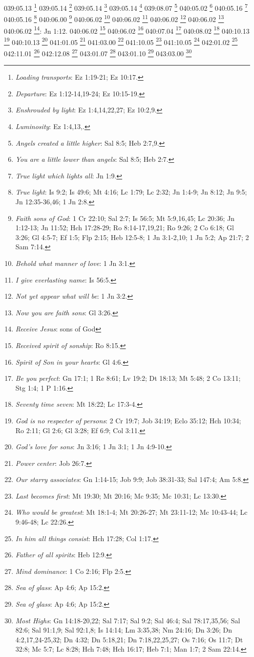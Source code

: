 {039:05.13 \footnote{\textit{Loading transports}: Ez 1:19-21; Ez 10:17.}
039:05.14 \footnote{\textit{Departure}: Ez 1:12-14,19-24; Ez 10:15-19.}
039:05.14 \footnote{\textit{Enshrouded by light}: Ez 1:4,14,22,27; Ez 10:2,9.}
039:05.14 \footnote{\textit{Luminosity}: Ez 1:4,13,.}
039:08.07 \footnote{\textit{Angels created a little higher}: Sal 8:5; Heb 2:7,9.}
040:05.02 \footnote{\textit{You are a little lower than angels}: Sal 8:5; Heb 2:7.}
040:05.16 \footnote{\textit{True light which lights all}: Jn 1:9.}
040:05.16 \footnote{\textit{True light}: Is 9:2; Is 49:6; Mt 4:16; Lc 1:79; Lc 2:32; Jn 1:4-9; Jn 8:12; Jn 9:5; Jn 12:35-36,46; 1 Jn 2:8.}
040:06.00 \footnote{\textit{Faith sons of God}: 1 Cr 22:10; Sal 2:7; Is 56:5; Mt 5:9,16,45; Lc 20:36; Jn 1:12-13; Jn 11:52; Hch 17:28-29; Ro 8:14-17,19,21; Ro 9:26; 2 Co 6:18; Gl 3:26; Gl 4:5-7; Ef 1:5; Flp 2:15; Heb 12:5-8; 1 Jn 3:1-2,10; 1 Jn 5:2; Ap 21:7; 2 Sam 7:14.}
040:06.02 \footnote{\textit{Behold what manner of love}: 1 Jn 3:1.}
040:06.02 \footnote{\textit{I give everlasting name}: Is 56:5.}
040:06.02 \footnote{\textit{Not yet appear what will be}: 1 Jn 3:2.}
040:06.02 \footnote{\textit{Now you are faith sons}: Gl 3:26.}
040:06.02 \footnote{\textit{Receive Jesus}: sons of God}: Jn 1:12.}
040:06.02 \footnote{\textit{Received spirit of sonship}: Ro 8:15.}
040:06.02 \footnote{\textit{Spirit of Son in your hearts}: Gl 4:6.}
040:07.04 \footnote{\textit{Be you perfect}: Gn 17:1; 1 Re 8:61; Lv 19:2; Dt 18:13; Mt 5:48; 2 Co 13:11; Stg 1:4; 1 P 1:16.}
040:08.02 \footnote{\textit{Seventy time seven}: Mt 18:22; Lc 17:3-4.}
040:10.13 \footnote{\textit{God is no respecter of persons}: 2 Cr 19:7; Job 34:19; Eclo 35:12; Hch 10:34; Ro 2:11; Gl 2:6; Gl 3:28; Ef 6:9; Col 3:11.}
040:10.13 \footnote{\textit{God's love for sons}: Jn 3:16; 1 Jn 3:1; 1 Jn 4:9-10.}
041:01.05 \footnote{\textit{Power center}: Job 26:7.}
041:03.00 \footnote{\textit{Our starry associates}: Gn 1:14-15; Job 9:9; Job 38:31-33; Sal 147:4; Am 5:8.}
041:10.05 \footnote{\textit{Last becomes first}: Mt 19:30; Mt 20:16; Mc 9:35; Mc 10:31; Lc 13:30.}
041:10.05 \footnote{\textit{Who would be greatest}: Mt 18:1-4; Mt 20:26-27; Mt 23:11-12; Mc 10:43-44; Lc 9:46-48; Lc 22:26.}
042:01.02 \footnote{\textit{In him all things consist}: Hch 17:28; Col 1:17.}
042:11.01 \footnote{\textit{Father of all spirits}: Heb 12:9.}
042:12.08 \footnote{\textit{Mind dominance}: 1 Co 2:16; Flp 2:5.}
043:01.07 \footnote{\textit{Sea of glass}: Ap 4:6; Ap 15:2.}
043:01.10 \footnote{\textit{Sea of glass}: Ap 4:6; Ap 15:2.}
043:03.00 \footnote{\textit{Most Highs}: Gn 14:18-20,22; Sal 7:17; Sal 9:2; Sal 46:4; Sal 78:17,35,56; Sal 82:6; Sal 91:1,9; Sal 92:1,8; Is 14:14; Lm 3:35,38; Nm 24:16; Dn 3:26; Dn 4:2,17,24-25,32; Dn 4:32; Dn 5:18,21; Dn 7:18,22,25,27; Os 7:16; Os 11:7; Dt 32:8; Mc 5:7; Lc 8:28; Hch 7:48; Hch 16:17; Heb 7:1; Man 1:7; 2 Sam 22:14.}
